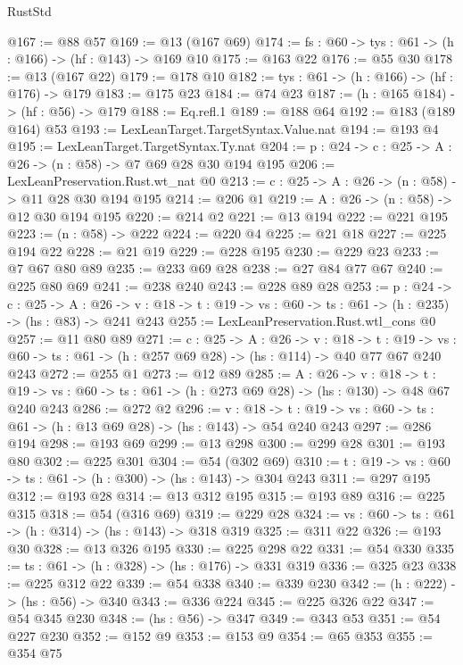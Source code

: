 \begin{lexlean}{RustStd}
\begin{coremodule}
@167 := @88 @57
@169 := @13 (@167 @69)
@174 := {fs : @60} -> {tys : @61} -> (h : @166) -> (hf : @143) -> @169 @10
@175 := @163 @22
@176 := @55 @30
@178 := @13 (@167 @22)
@179 := @178 @10
@182 := {tys : @61} -> (h : @166) -> (hf : @176) -> @179
@183 := @175 @23
@184 := @74 @23
@187 := (h : @165 @184) -> (hf : @56) -> @179
@188 := Eq.refl.{1}
@189 := @188 @64
@192 := @183 (@189 @164) @53
@193 := LexLeanTarget.TargetSyntax.Value.nat
@194 := @193 @4
@195 := LexLeanTarget.TargetSyntax.Ty.nat
@204 := {p : @24} -> {c : @25} -> {A : @26} -> (n : @58) -> @7 @69 @28 @30 @194 @195
@206 := LexLeanPreservation.Rust.wt_nat @0
@213 := {c : @25} -> {A : @26} -> (n : @58) -> @11 @28 @30 @194 @195
@214 := @206 @1
@219 := {A : @26} -> (n : @58) -> @12 @30 @194 @195
@220 := @214 @2
@221 := @13 @194
@222 := @221 @195
@223 := (n : @58) -> @222
@224 := @220 @4
@225 := @21 @18
@227 := @225 @194 @22
@228 := @21 @19
@229 := @228 @195
@230 := @229 @23
@233 := @7 @67 @80 @89
@235 := @233 @69 @28
@238 := @27 @84 @77 @67
@240 := @225 @80 @69
@241 := @238 @240
@243 := @228 @89 @28
@253 := {p : @24} ->
  {c : @25} ->
  {A : @26} ->
  {v : @18} -> {t : @19} -> {vs : @60} -> {ts : @61} -> (h : @235) -> (hs : @83) -> @241 @243
@255 := LexLeanPreservation.Rust.wtl_cons @0
@257 := @11 @80 @89
@271 := {c : @25} ->
  {A : @26} ->
  {v : @18} ->
  {t : @19} ->
  {vs : @60} -> {ts : @61} -> (h : @257 @69 @28) -> (hs : @114) -> @40 @77 @67 @240 @243
@272 := @255 @1
@273 := @12 @89
@285 := {A : @26} ->
  {v : @18} ->
  {t : @19} -> {vs : @60} -> {ts : @61} -> (h : @273 @69 @28) -> (hs : @130) -> @48 @67 @240 @243
@286 := @272 @2
@296 := {v : @18} ->
  {t : @19} -> {vs : @60} -> {ts : @61} -> (h : @13 @69 @28) -> (hs : @143) -> @54 @240 @243
@297 := @286 @194
@298 := @193 @69
@299 := @13 @298
@300 := @299 @28
@301 := @193 @80
@302 := @225 @301
@304 := @54 (@302 @69)
@310 := {t : @19} -> {vs : @60} -> {ts : @61} -> (h : @300) -> (hs : @143) -> @304 @243
@311 := @297 @195
@312 := @193 @28
@314 := @13 @312 @195
@315 := @193 @89
@316 := @225 @315
@318 := @54 (@316 @69)
@319 := @229 @28
@324 := {vs : @60} -> {ts : @61} -> (h : @314) -> (hs : @143) -> @318 @319
@325 := @311 @22
@326 := @193 @30
@328 := @13 @326 @195
@330 := @225 @298 @22
@331 := @54 @330
@335 := {ts : @61} -> (h : @328) -> (hs : @176) -> @331 @319
@336 := @325 @23
@338 := @225 @312 @22
@339 := @54 @338
@340 := @339 @230
@342 := (h : @222) -> (hs : @56) -> @340
@343 := @336 @224
@345 := @225 @326 @22
@347 := @54 @345 @230
@348 := (hs : @56) -> @347
@349 := @343 @53
@351 := @54 @227 @230
@352 := @152 @9
@353 := @153 @9
@354 := @65 @353
@355 := @354 @75

\end{coremodule}
\end{lexlean}
